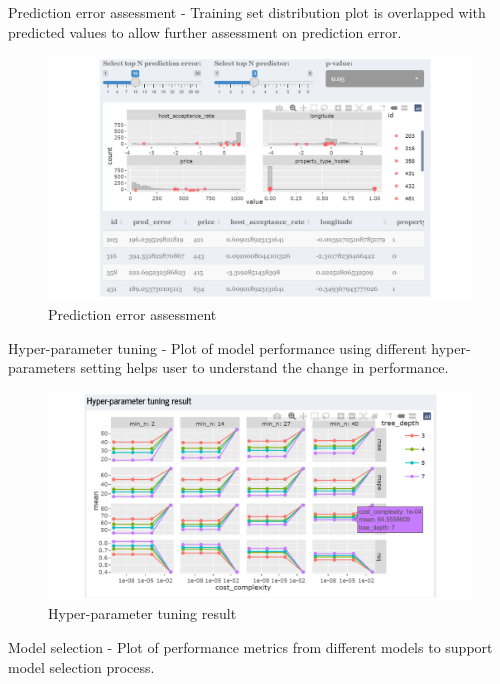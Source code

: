 \documentclass{acm_proc_article-sp}
\begin{document}
Prediction error assessment - Training set distribution plot is
overlapped with predicted values to allow further assessment on
prediction error.

\begin{figure}[H]

{\centering \includegraphics[width=1\linewidth]{images/prederror} 

}

\caption{Prediction error assessment}\label{fig:unnamed-chunk-14}
\end{figure}

Hyper-parameter tuning - Plot of model performance using different
hyper-parameters setting helps user to understand the change in
performance.

\begin{figure}[H]

{\centering \includegraphics[width=1\linewidth]{images/hypartune} 

}

\caption{Hyper-parameter tuning result}\label{fig:unnamed-chunk-15}
\end{figure}

Model selection - Plot of performance metrics from different models to
support model selection process.
\end{document}
